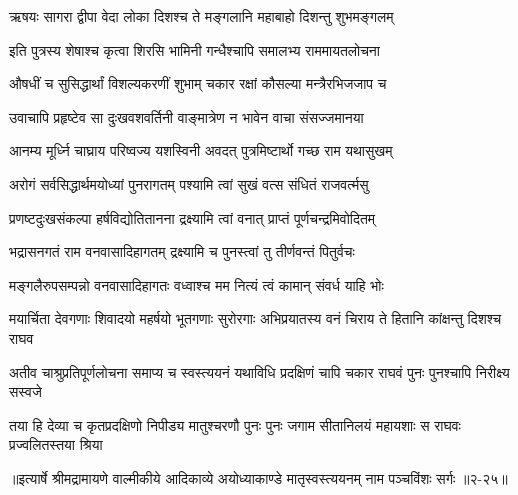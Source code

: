 \twolineshloka
{ऋषयः सागरा द्वीपा वेदा लोका दिशश्च ते}
{मङ्गलानि महाबाहो दिशन्तु शुभमङ्गलम्} %

\twolineshloka
{इति पुत्रस्य शेषाश्च कृत्वा शिरसि भामिनी}
{गन्धैश्चापि समालभ्य राममायतलोचना} %

\twolineshloka
{औषधीं च सुसिद्धार्थां विशल्यकरणीं शुभाम्}
{चकार रक्षां कौसल्या मन्त्रैरभिजजाप च} %

\twolineshloka
{उवाचापि प्रहृष्टेव सा दुःखवशवर्तिनी}
{वाङ्मात्रेण न भावेन वाचा संसज्जमानया} %

\twolineshloka
{आनम्य मूर्ध्नि चाघ्राय परिष्वज्य यशस्विनी}
{अवदत् पुत्रमिष्टार्थो गच्छ राम यथासुखम्} %

\twolineshloka
{अरोगं सर्वसिद्धार्थमयोध्यां पुनरागतम्}
{पश्यामि त्वां सुखं वत्स संधितं राजवर्त्मसु} %

\twolineshloka
{प्रणष्टदुःखसंकल्पा हर्षविद्योतितानना}
{द्रक्ष्यामि त्वां वनात् प्राप्तं पूर्णचन्द्रमिवोदितम्} %

\twolineshloka
{भद्रासनगतं राम वनवासादिहागतम्}
{द्रक्ष्यामि च पुनस्त्वां तु तीर्णवन्तं पितुर्वचः} %

\twolineshloka
{मङ्गलैरुपसम्पन्नो वनवासादिहागतः}
{वध्वाश्च मम नित्यं त्वं कामान् संवर्ध याहि भोः} %

\twolineshloka
{मयार्चिता देवगणाः शिवादयो महर्षयो भूतगणाः सुरोरगाः}
{अभिप्रयातस्य वनं चिराय ते हितानि कांक्षन्तु दिशश्च राघव} %

\twolineshloka
{अतीव चाश्रुप्रतिपूर्णलोचना समाप्य च स्वस्त्ययनं यथाविधि}
{प्रदक्षिणं चापि चकार राघवं पुनः पुनश्चापि निरीक्ष्य सस्वजे} %

\twolineshloka
{तया हि देव्या च कृतप्रदक्षिणो निपीड्य मातुश्चरणौ पुनः पुनः}
{जगाम सीतानिलयं महायशाः स राघवः प्रज्वलितस्तया श्रिया} %


॥इत्यार्षे श्रीमद्रामायणे वाल्मीकीये आदिकाव्ये अयोध्याकाण्डे मातृस्वस्त्ययनम् नाम पञ्चविंशः सर्गः ॥२-२५॥

